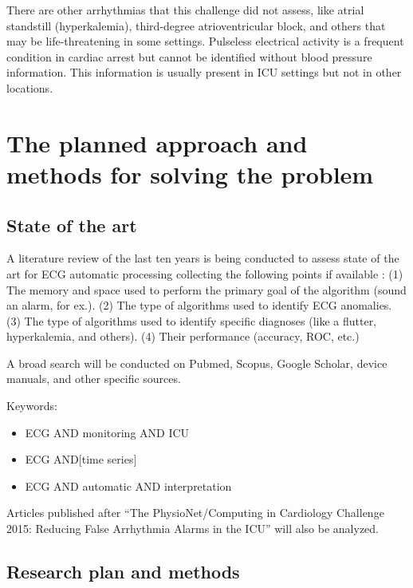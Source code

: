 \documentclass[12pt,twoside]{fmupthesis}
\providecommand{\tightlist}{%
  \setlength{\itemsep}{0pt}\setlength{\parskip}{0pt}}
\begin{document}
There are other arrhythmias that this challenge did not assess, like atrial standstill (hyperkalemia), third-degree
atrioventricular block, and others that may be life-threatening in some settings. Pulseless electrical activity is a
frequent condition in cardiac arrest but cannot be identified without blood pressure information. This information is
usually present in ICU settings but not in other locations.

\hypertarget{the-planned-approach-and-methods-for-solving-the-problem}{%
\chapter{The planned approach and methods for solving the problem}\label{the-planned-approach-and-methods-for-solving-the-problem}}

\hypertarget{state-of-the-art}{%
\section{State of the art}\label{state-of-the-art}}

A literature review of the last ten years is being conducted to assess state of the art for ECG automatic processing
collecting the following points if available : (1) The memory and space used to perform the primary goal of the
algorithm (sound an alarm, for ex.). (2) The type of algorithms used to identify ECG anomalies. (3) The type of
algorithms used to identify specific diagnoses (like a flutter, hyperkalemia, and others). (4) Their performance
(accuracy, ROC, etc.)

A broad search will be conducted on Pubmed, Scopus, Google Scholar, device manuals, and other specific sources.

Keywords:
\begin{itemize}
\tightlist
\item
  ECG AND monitoring AND ICU
\item
  ECG AND{[}time series{]}
\item
  ECG AND automatic AND interpretation
\end{itemize}
Articles published after ``The PhysioNet/Computing in Cardiology Challenge 2015: Reducing False Arrhythmia Alarms in the
ICU'' will also be analyzed.

\hypertarget{research-plan-and-methods}{%
\section{Research plan and methods}\label{research-plan-and-methods}}
\end{document}
